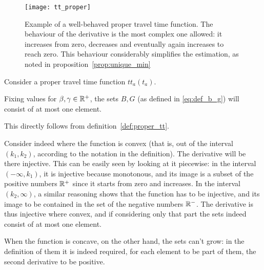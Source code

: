 \begin{figure}
  \centering
  \texttt{[image: tt\_proper]}
  \caption{Example of a well-behaved proper travel time function.
    The behaviour of the derivative is the most complex one allowed:
    it increases from zero, decreases and eventually again increases to reach zero.
  This behaviour considerably simplifies the estimation, as noted in proposition~\ref{prop:unique_min}}
  \label{fig:prop_travel_time}
\end{figure}

\begin{obs}
  \label{obs:unique_min}
  Consider a proper travel time function \(tt_a(t_a)\).

  Fixing values for \(\beta, \gamma \in \mathbb{R}^+\),
  the sets \(B, G\) (as defined in \eqref{eq:def_b_g}) will consist of at most one element.
\end{obs}

This directly follows from definition~\ref{def:proper_tt}.

Consider indeed where the function is convex
(that is, out of the interval \((k_1, k_2)\), according to the notation in the definition).
The derivative will be there injective.
This can be easily seen by looking at it piecewise:
in the interval \((-\infty, k_1)\), it is injective because monotonous,
and its image is a subset of the positive numbers \(\mathbb{R}^+\) since it starts from zero and increases.
In the interval \((k_2, \infty)\), a similar reasoning shows that the function has to be injective,
and its image to be contained in the set of the negative numbers \(\mathbb{R}^-\).
The derivative is thus injective where convex,
and if considering only that part the sets indeed consist of at most one element.

When the function is concave, on the other hand,
the sets can't grow: in the definition of them it is indeed required,
for each element to be part of them, the second derivative to be positive.



